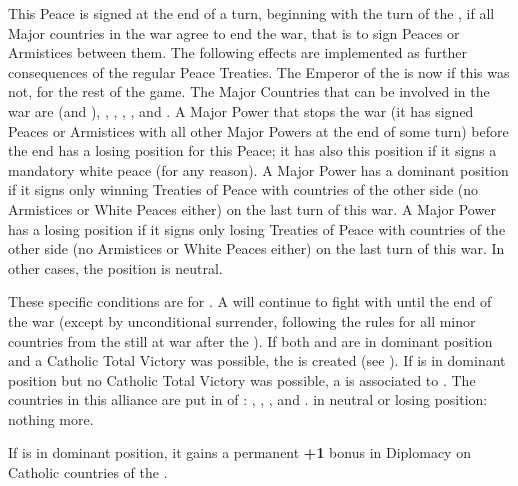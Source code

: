 \begin{digressions}
  \aparag This Peace is signed at the end of a turn, beginning with the turn
  of the , if all Major countries in the war
  agree to end the war, that is to sign Peaces or Armistices between them. The
  following effects are implemented as further consequences of the regular
  Peace Treaties.
  \aparag The Emperor of the \HRE is now \HAB if this was not, for the rest of
  the game.
  \aparag The Major Countries that can be involved in the war are \SPA (and
  \AUSmin), \AUS, \FRA, \HOL, \SUE, \ENG and \POL.
  \bparag A Major Power that stops the war (it has signed Peaces or Armistices
  with all other Major Powers at the end of some turn) before the end has a
  losing position for this Peace; it has also this position if it signs a
  mandatory white peace (for any reason).
  \bparag A Major Power has a dominant position if it signs only winning
  Treaties of Peace with countries of the other side (no Armistices or White
  Peaces either) on the last turn of this war.
  \bparag A Major Power has a losing position if it signs only losing Treaties
  of Peace with countries of the other side (no Armistices or White Peaces
  either) on the last turn of this war.
  \bparag In other cases, the position is neutral.

  \bparag These specific conditions are for \MAJHAB.
  \bparag A \AUSmin will continue to fight with \SPA until the end of the war
  (except by unconditional surrender, following the rules for all minor
  countries from the \HRE still at war after the ).
  \bparag If both \HIS and \AUS are in dominant position and a Catholic Total
  Victory was possible, the  is created (see
  ).
  \bparag If \HAB is in dominant position but no Catholic Total Victory was
  possible, a  is associated to \HAB.
  The countries in this alliance are put in \EG of \HAB: \paysBaviere,
  \paysTreves, \paysAlsace, \paysBade and \paysWurtemberg.
  \bparag \HAB in neutral or losing position: nothing more.

  \aparag[Spain] If \SPA is in dominant position, it gains a permanent {\bf
    +1} bonus in Diplomacy on Catholic countries of the \HRE.



\end{digressions}
